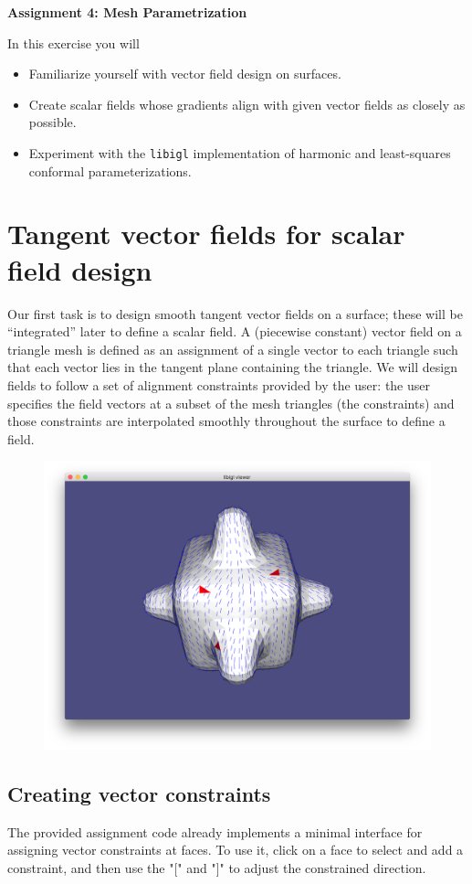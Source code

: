 \documentclass[11pt]{amsart}
\begin{document}
\hspace{50pt}

\begin{center}

{\huge \textbf{Assignment 4: Mesh Parametrization}}\\
\vspace{10pt}
\end{center}

In this exercise you will
\begin{itemize}
\item{Familiarize yourself with vector field design on surfaces.}
\item{Create scalar fields whose gradients align with given vector fields as closely as possible.}
\item{Experiment with the \texttt{libigl} implementation of harmonic and least-squares conformal parameterizations.}
\end{itemize}

\section{Tangent vector fields for scalar field design}
Our first task is to design smooth tangent vector fields on a surface; these
will be ``integrated'' later to define a scalar field. A (piecewise constant)
vector field on a triangle mesh is defined as an assignment of a single vector
to each triangle such that each vector lies in the tangent plane containing the
triangle. We will design fields to follow a set of alignment constraints
provided by the user: the user specifies the field vectors at a subset of the
mesh triangles (the constraints) and those constraints are interpolated smoothly
throughout the surface to define a field.

\begin{figure}[h!]
\includegraphics[width=0.5\linewidth]{vf}
\label{fig:vf}
\end{figure}

\subsection{Creating vector constraints}
The provided assignment code already implements
a minimal interface for assigning vector constraints at faces.
To use it, click on a face to select and add a constraint, and then use the "[" and "]" to adjust the constrained direction. 
\end{document}
